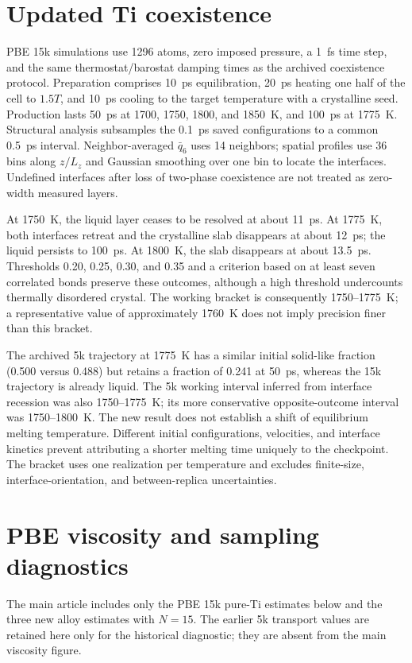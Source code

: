 \documentclass[10pt]{article}
\begin{document}
\section{Updated Ti coexistence}
PBE 15k simulations use 1296 atoms, zero imposed pressure, a 1~fs time step, and the same thermostat/barostat damping times as the archived coexistence protocol. Preparation comprises 10~ps equilibration, 20~ps heating one half of the cell to $1.5T$, and 10~ps cooling to the target temperature with a crystalline seed. Production lasts 50~ps at 1700, 1750, 1800, and 1850~K, and 100~ps at 1775~K. Structural analysis subsamples the 0.1~ps saved configurations to a common 0.5~ps interval. Neighbor-averaged $\bar q_6$ uses 14 neighbors; spatial profiles use 36 bins along $z/L_z$ and Gaussian smoothing over one bin to locate the interfaces. Undefined interfaces after loss of two-phase coexistence are not treated as zero-width measured layers.

At 1750~K, the liquid layer ceases to be resolved at about 11~ps. At 1775~K, both interfaces retreat and the crystalline slab disappears at about 12~ps; the liquid persists to 100~ps. At 1800~K, the slab disappears at about 13.5~ps. Thresholds 0.20, 0.25, 0.30, and 0.35 and a criterion based on at least seven correlated bonds preserve these outcomes, although a high threshold undercounts thermally disordered crystal. The working bracket is consequently 1750--1775~K; a representative value of approximately 1760~K does not imply precision finer than this bracket.

The archived 5k trajectory at 1775~K has a similar initial solid-like fraction (0.500 versus 0.488) but retains a fraction of 0.241 at 50~ps, whereas the 15k trajectory is already liquid. The 5k working interval inferred from interface recession was also 1750--1775~K; its more conservative opposite-outcome interval was 1750--1800~K. The new result does not establish a shift of equilibrium melting temperature. Different initial configurations, velocities, and interface kinetics prevent attributing a shorter melting time uniquely to the checkpoint. The bracket uses one realization per temperature and excludes finite-size, interface-orientation, and between-replica uncertainties.

\section{PBE viscosity and sampling diagnostics}
The main article includes only the PBE 15k pure-Ti estimates below and the three new alloy estimates with $N=15$. The earlier 5k transport values are retained here only for the historical diagnostic; they are absent from the main viscosity figure.
\end{document}
